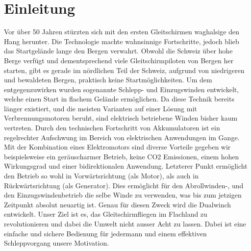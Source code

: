 \section{Einleitung}
Vor über 50 Jahren stürzten sich mit den ersten Gleitschirmen waghalsige den Hang herunter. Die Technologie machte wahnsinnige Fortschritte, jedoch blieb das Startgelände lange den Bergen verwahrt. Obwohl die Schweiz über hohe Berge verfügt und dementsprechend viele Gleitschirmpiloten von Bergen her starten, gibt es gerade im nördlichen Teil der Schweiz, aufgrund von niedrigeren und bewaldeten Bergen, praktisch keine Startmöglichkeiten. Um dem entgegenzuwirken wurden sogenannte Schlepp- und Einzugswinden entwickelt, welche einen Start in flachem Gelände ermöglichen. Da diese Technik bereits länger existiert, und die meisten Varianten auf einer Lösung mit Verbrennungsmotoren beruht, sind elektrisch betriebene Winden bisher kaum vertreten. Durch den technischen Fortschritt von Akkumulatoren ist ein regelrechter Aufschwung im Bereich von elektrischen Anwendungen im Gange. Mit der Kombination eines Elektromotors sind diverse Vorteile gegeben wir beispielsweise ein geräuscharmer Betrieb, keine CO2 Emissionen, einem hohen Wirkungsgrad und einer bidirektionalen Anwendung. Letzterer Punkt ermöglicht den Betrieb so wohl in Vorwärtsrichtung (als Motor), als auch in Rückwärtsrichtung (als Generator). Dies ermöglicht für den Abrollwinden-, und den Einzugswindenbetrieb die selbe Winde zu verwenden, was bis zum jetzigen Zeitpunkt absolut neuartig ist. Genau für diesen Zweck wird die Dualwinch entwickelt. Unser Ziel ist es, das Gleitschirmfliegen im Flachland zu revolutionieren und dabei die Umwelt nicht ausser Acht zu lassen. Dabei ist eine einfache und sichere Bedienung für jedermann und einem effektiven Schleppvorgang unsere Motivation.

